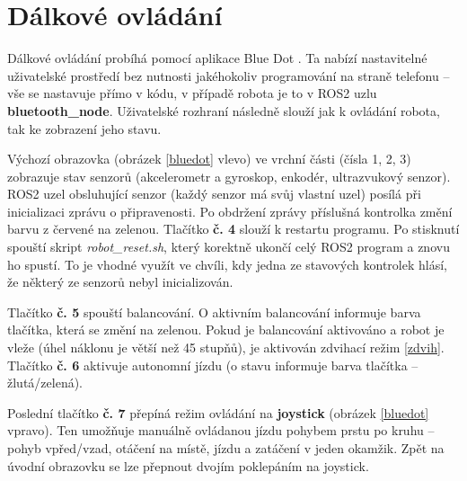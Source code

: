\section{Dálkové ovládání}
\label{remote}
Dálkové ovládání probíhá pomocí aplikace Blue Dot \cite{bluedot}. Ta nabízí nastavitelné uživatelské prostředí bez nutnosti jakéhokoliv programování na straně telefonu -- vše se nastavuje přímo v kódu, v případě robota je to v ROS2 uzlu \textbf{bluetooth\_node}. Uživatelské rozhraní následně slouží jak k ovládání robota, tak ke zobrazení jeho stavu.

Výchozí obrazovka (obrázek \ref{bluedot} vlevo) ve vrchní části (čísla 1, 2, 3) zobrazuje stav senzorů (akcelerometr a gyroskop, enkodér, ultrazvukový senzor). ROS2 uzel obsluhující senzor (každý senzor má svůj vlastní uzel) posílá při inicializaci zprávu o připravenosti. Po obdržení zprávy příslušná kontrolka změní barvu z červené na zelenou. Tlačítko \textbf{č. 4} slouží k restartu programu. Po stisknutí spouští skript \textit{robot\_reset.sh}, který korektně ukončí celý ROS2 program a znovu ho spustí. To je vhodné využít ve chvíli, kdy jedna ze stavových kontrolek hlásí, že některý ze senzorů nebyl inicializován.

Tlačítko \textbf{č. 5} spouští balancování. O aktivním balancování informuje barva tlačítka, která se změní na zelenou. Pokud je balancování aktivováno a robot je vleže (úhel náklonu je větší než 45 stupňů), je aktivován zdvihací režim \ref{zdvih}. Tlačítko \textbf{č. 6} aktivuje autonomní jízdu (o stavu informuje barva tlačítka -- žlutá/zelená).

Poslední tlačítko \textbf{č. 7} přepíná režim ovládání na \textbf{joystick} (obrázek \ref{bluedot} vpravo). Ten umožňuje manuálně ovládanou jízdu pohybem prstu po kruhu -- pohyb vpřed/vzad, otáčení na místě, jízdu a zatáčení v jeden okamžik. Zpět na úvodní obrazovku se lze přepnout dvojím poklepáním na joystick.


